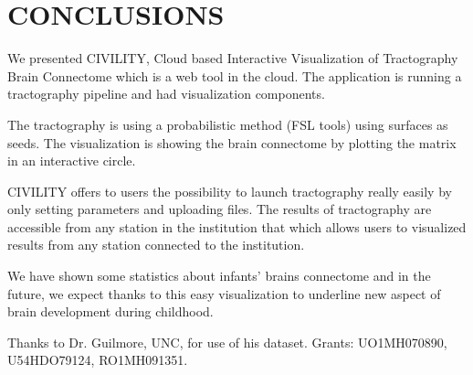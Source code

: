 \documentclass[]{spie}  %
\begin{document}
\section{CONCLUSIONS} 

We presented CIVILITY, Cloud based Interactive Visualization of Tractography Brain Connectome which is a  web tool in the cloud. The application is running a tractography pipeline and had visualization components. 

The tractography is using a probabilistic method (FSL tools) using surfaces as seeds. 
The visualization is showing the brain connectome by plotting the matrix in an interactive circle. 

CIVILITY offers to users the possibility to launch tractography really easily by only setting parameters and uploading files. 
The results of tractography are accessible from any station in the institution that which allows users to visualized results from any station connected to the institution. 

We have shown some statistics about infants' brains connectome and in the future, we expect thanks to this easy visualization to underline new aspect of brain development during childhood.








\acknowledgments

Thanks to Dr. Guilmore, UNC, for use of his dataset. Grants: UO1MH070890, U54HDO79124, RO1MH091351. 


\end{document}

